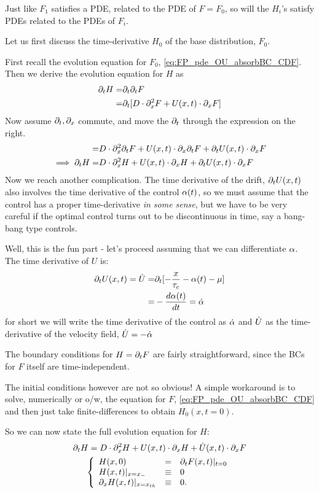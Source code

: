 \documentclass{article}
\begin{document}
Just like $F_1$ satisfies a PDE, related to the PDE of $F = F_0$, so will the
$H_i$'s satisfy PDEs related to the PDEs of $F_i$.  

Let us first discuss the time-derivative $H_0$ of the base distribution,
$F_0$.

First recall the evolution equation for $F_0$, \cref{eq:FP_pde_OU_absorbBC_CDF}.
Then we derive the evolution equation for $H$ as
\begin{align*}
{\partial}_t H =& {\partial}_t {\partial}_t F 
\\
 =& {\partial}_t [ D \cdot {\partial}^2_x F +
					U(x,t) \cdot {\partial}_x F]
\end{align*}
Now assume ${\partial}_t, {\partial}_x$ commute, and move the ${\partial}_t$ through the expression
on the right.
\begin{align*}
 =&  D \cdot {\partial}^2_x {\partial}_tF +
					U(x,t) \cdot {\partial}_x {\partial}_t F + 
					{\partial}_t U(x,t) \cdot {\partial}_x F
					\\
 \implies {\partial}_t H =&  D \cdot {\partial}^2_x H +
					U(x,t) \cdot {\partial}_x H + 
					{\partial}_t U(x,t) \cdot {\partial}_x  F
\end{align*}
Now we reach another complication. The time derivative
of the drift, ${\partial}_t U(x,t)$ also involves the time derivative of the control ${\alpha}(t)$,
so we must assume that the control has a proper time-derivative {\sl in some
sense}, but we have to be very careful if the optimal control turns out to be
discontinuous in time, say a bang-bang type controls.

Well, this is the fun part - let's proceed assuming that we can differentiate
${\alpha}$. The time derivative of $U$ is:
\begin{align*}
{\partial}_t U(x,t) ={ \dot{U}}  =& {\partial}_t [ -\frac x{{ \tau_{c} }} - {\alpha}(t) - {\mu }]
\\
=&  -\frac{d{\alpha}(t)}{dt} =  { \dot{\alpha} } 
\end{align*}
for short we will write the time derivative of the control as ${ \dot{\alpha} }$ and
${ \dot{U}}$ as the time-derivative of the velocity field, ${ \dot{U}}= -{ \dot{\alpha} }$

The boundary conditions for $H = {\partial}_t F$ are fairly straightforward, since the
BCs for $F$ itself are time-independent. 

The initial conditions however are not so obvious! A simple workaround is to
solve, numerically or o/w, the equation for $F$,
\cref{eq:FP_pde_OU_absorbBC_CDF} and then just take finite-differences to obtain
$H_0(x,t=0)$.

So we can now state the full evolution equation for $H$:
\begin{equation}
\begin{gathered}
{\partial}_t H =  D \cdot {\partial}^2_x H +
					U(x,t) \cdot {\partial}_x H + 
					{ \dot{U}}(x,t) \cdot {\partial}_x  F
	\\
	\left\{ \begin{array}{lcl}
	 H(x,0) &=& {\partial}_t F(x,t)|_{t=0}
	\\
	H (x,t) |_{x={ x_{-} }} &\equiv& 0
	\\
	{\partial}_x H(x,t) |_{x={ x_{th} }} &\equiv& 0.
	\end{array} \right.
\label{eq:H_pde_OU_absorbBC_CDF}
\end{gathered}
\end{equation}
\end{document}

